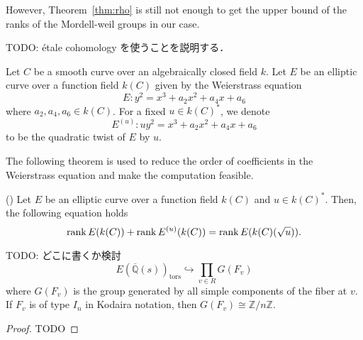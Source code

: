 \documentclass[main]{subfiles}
\begin{document}
However, Theorem~\ref{thm:rho} is still not enough to get the upper bound of the ranks of the Mordell-weil groups in our case.

TODO: \'etale cohomology を使うことを説明する．


\begin{dfn}
    Let $C$ be a smooth curve over an algebraically closed field $k$.
    Let $E$ be an elliptic curve over a function field $k(C)$ given by the Weierstrass equation
    \begin{equation}
        E: y^{2} = x^{3} + a_{2} x^2 + a_{4} x + a_{6}
    \end{equation}
    where $a_{2}, a_{4}, a_{6} \in k(C)$.
    For a fixed $u \in k(C)^*$, we denote
    \begin{equation}
        E^{(u)}: u y^{2} = x^{3} + a_{2} x^2 + a_{4} x + a_{6}
    \end{equation}
    to be the quadratic twist of $E$ by $u$.
\end{dfn}

The following theorem is used to reduce the order of coefficients in the Weierstrass equation and make the computation feasible.

\begin{thm}{(\cite[Exercise 10.16]{ref:aec})}
    Let $E$ be an elliptic curve over a function field $k(C)$ and $u \in k(C)^*$.
    Then, the following equation holds
    \begin{equation}
        \operatorname{rank} E(k(C)) + \operatorname{rank} E^{(u)}(k(C)) = \operatorname{rank} E(k(C)(\sqrt{u})).
    \end{equation}
\end{thm}

\begin{thm}{TODO: どこに書くか検討}
    \begin{equation}
        E(\overline{\mathbb{Q}}(s))_{\text{tors}} \hookrightarrow \prod_{v \in R} G(F_{v})
    \end{equation}
    where $G(F_{v})$ is the group generated by all simple components of the fiber at $v$.
    If $F_v$ is of type $I_n$ in Kodaira notation, then $G(F_{v}) \cong \mathbb{Z} / n \mathbb{Z}$.
\end{thm}
\begin{proof}
    TODO
\end{proof}
\end{document}
